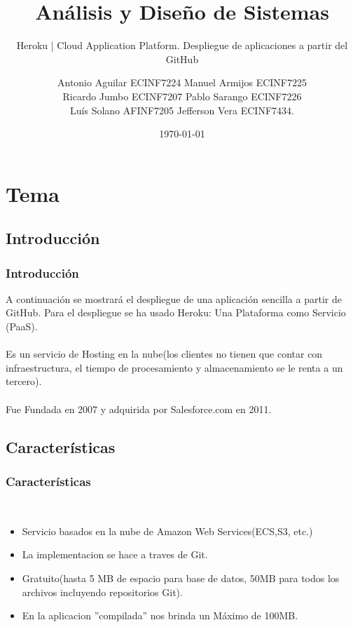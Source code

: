 \documentclass{beamer}
\title{Análisis y Diseño de Sistemas}
\subtitle{Heroku | Cloud Application Platform.  Despliegue de aplicaciones a partir del GitHub}
\author{
Antonio Aguilar ECINF7224
Manuel Armijos ECINF7225 \\
Ricardo Jumbo ECINF7207 
Pablo Sarango ECINF7226 \\
Luís Solano AFINF7205
Jefferson Vera ECINF7434.
}
\date{\today}
\institute{Ingeniería en Sistemas\\}
\begin{document}
\justifying
	
	\begin{frame}[plain,t]
		\titlepage
	\end{frame}

	\section{Tema}

	\subsection{Introducción}
		\begin{frame}
			\frametitle{Introducción}
			A continuación se mostrará el despliegue de una aplicación sencilla a partir de GitHub. Para el despliegue se ha usado Heroku: Una Plataforma como Servicio (PaaS).\\ \ \\
			
			Es un servicio de Hosting en la nube(los clientes no tienen que contar con infraestructura, el tiempo de procesamiento y almacenamiento se le renta a un tercero).\\ \ \\
			
			Fue Fundada en 2007 y adquirida por Salesforce.com en 2011.
		\end{frame}
		
		\subsection{Características}
		\begin{frame}			
			\frametitle{Características}\\
			\begin{itemize}
			\item Servicio basados en la nube de Amazon Web Services(ECS,S3, etc.)
			\item La implementacion se hace a traves de Git.
			\item Gratuito(hasta 5 MB de espacio para base de datos, 50MB para todos los archivos incluyendo repositorios Git).
			\item En la aplicacion ”compilada” nos brinda un Máximo de 100MB.
			\end{itemize}
		\end{frame}	
		
\end{document}
